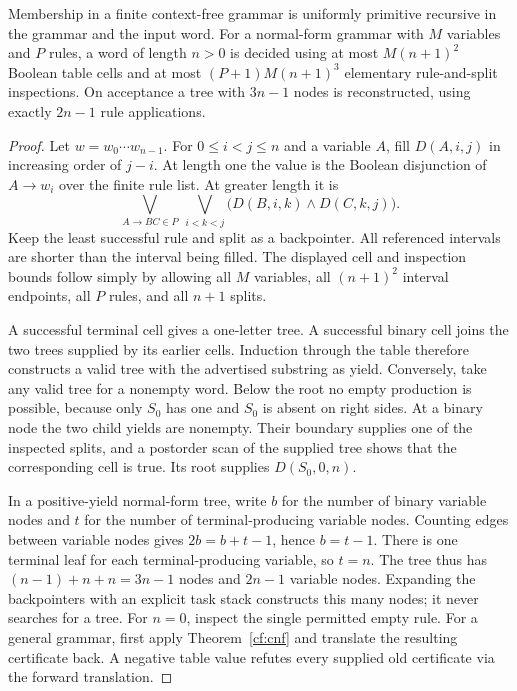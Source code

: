 \begin{theorem}
\label{cf:cyk}
Membership in a finite context-free grammar is uniformly primitive
recursive in the grammar and the input word.  For a normal-form grammar
with $M$ variables and $P$ rules, a word of length $n>0$ is decided using
at most $M(n+1)^2$ Boolean table cells and at most
$(P+1)M(n+1)^3$ elementary rule-and-split inspections.  On acceptance a tree
with $3n-1$ nodes is reconstructed, using exactly $2n-1$ rule applications.
\end{theorem}

\begin{proof}
Let $w=w_0\cdots w_{n-1}$.  For $0\leq i<j\leq n$ and a variable $A$, fill
$D(A,i,j)$ in increasing order of $j-i$.  At length one the value is the
Boolean disjunction of $A\to w_i$ over the finite rule list.  At greater
length it is
\[
 \bigvee_{A\to BC\in P}\ \bigvee_{i<k<j}
       \bigl(D(B,i,k)\wedge D(C,k,j)\bigr).
\]
Keep the least successful rule and split as a backpointer.  All referenced
intervals are shorter than the interval being filled.  The displayed cell
and inspection bounds follow simply by allowing all $M$ variables, all
$(n+1)^2$ interval endpoints, all $P$ rules, and all $n+1$ splits.

A successful terminal cell gives a one-letter tree.  A successful binary
cell joins the two trees supplied by its earlier cells.  Induction through
the table therefore constructs a valid tree with the advertised substring
as yield.  Conversely, take any valid tree for a nonempty word.  Below the
root no empty production is possible, because only $S_0$ has one and $S_0$
is absent on right sides.  At a binary node the two child yields are
nonempty.  Their boundary supplies one of the inspected splits, and a
postorder scan of the supplied tree shows that the corresponding cell is
true.  Its root supplies $D(S_0,0,n)$.

In a positive-yield normal-form tree, write $b$ for the number of binary
variable nodes and $t$ for the number of terminal-producing variable nodes.
Counting edges between variable nodes gives $2b=b+t-1$, hence $b=t-1$.
There is one terminal leaf for each terminal-producing variable, so $t=n$.
The tree thus has $(n-1)+n+n=3n-1$ nodes and $2n-1$ variable nodes.  Expanding
the backpointers with an explicit task stack constructs this many nodes;
it never searches for a tree.  For $n=0$, inspect the single permitted empty
rule.  For a general grammar, first apply Theorem~\ref{cf:cnf} and translate
the resulting certificate back.  A negative table value refutes every
supplied old certificate via the forward translation.
\end{proof}


